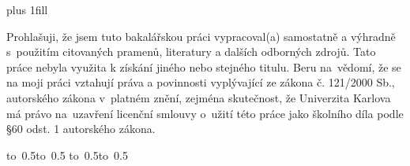 \newpage

\openright
\hypersetup{pageanchor=true}
\pagestyle{plain}
\vglue 0pt plus 1fill

\noindent
Prohlašuji, že jsem tuto bakalářskou práci vypracoval(a) samostatně a výhradně
s~použitím citovaných pramenů, literatury a dalších odborných zdrojů.
Tato práce nebyla využita k získání jiného nebo stejného titulu.
%
\medskip\noindent
Beru na~vědomí, že se na moji práci vztahují práva a povinnosti vyplývající
ze zákona č. 121/2000 Sb., autorského zákona v~platném znění, zejména skutečnost,
že Univerzita Karlova má právo na~uzavření licenční smlouvy o~užití této
práce jako školního díla podle §60 odst. 1 autorského zákona.

\vspace{10mm}


\hbox{\hbox to 0.5\hbox to 0.5\hsize{\dotfill\quad}}
\smallskip
\hbox{\hbox to 0.5\hsize{}\hbox to 0.5}

\vspace{20mm}
\newpage


\openright

\noindent
\Dedication

\newpage


\openright

